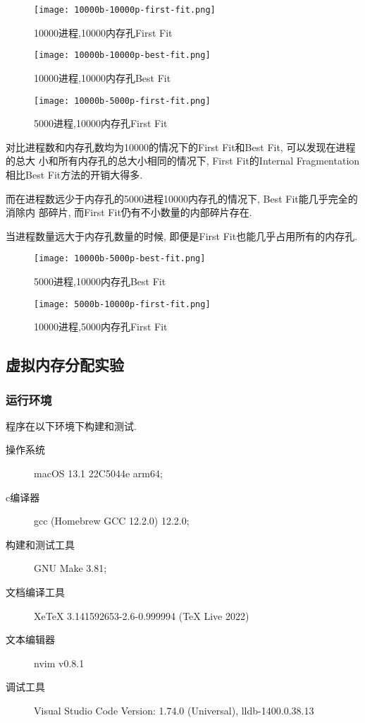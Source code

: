 \begin{figure}[ht!]
    \centering
    \texttt{[image: 10000b-10000p-first-fit.png]}
    \caption{10000进程,10000内存孔First Fit}
    \label{fig:10000p10000b-first}
\end{figure}

\begin{figure}[ht!]
    \centering
    \texttt{[image: 10000b-10000p-best-fit.png]}
    \caption{10000进程,10000内存孔Best Fit}
    \label{fig:10000p10000b-best}
\end{figure}

\begin{figure}[ht!]
    \centering
    \texttt{[image: 10000b-5000p-first-fit.png]}
    \caption{5000进程,10000内存孔First Fit}
    \label{fig:5000p10000b-first}
\end{figure}

对比进程数和内存孔数均为10000的情况下的First Fit和Best Fit, 可以发现在进程的总大
小和所有内存孔的总大小相同的情况下, First Fit的Internal Fragmentation相比Best
Fit方法的开销大得多.\par

而在进程数远少于内存孔的5000进程10000内存孔的情况下, Best Fit能几乎完全的消除内
部碎片, 而First Fit仍有不小数量的内部碎片存在.\par

当进程数量远大于内存孔数量的时候, 即便是First Fit也能几乎占用所有的内存孔.

\begin{figure}[ht!]
    \centering
    \texttt{[image: 10000b-5000p-best-fit.png]}
    \caption{5000进程,10000内存孔Best Fit}
    \label{fig:5000p10000b-best}
\end{figure}

\begin{figure}[ht!]
    \centering
    \texttt{[image: 5000b-10000p-first-fit.png]}
    \caption{10000进程,5000内存孔First Fit}
    \label{fig:10000p5000b-first}
\end{figure}

\subsection{虚拟内存分配实验}
\subsubsection{运行环境}
程序在以下环境下构建和测试.
\begin{description}
    \item[操作系统] macOS 13.1 22C5044e arm64;
    \item[c编译器] gcc (Homebrew GCC 12.2.0) 12.2.0;
    \item[构建和测试工具] GNU Make 3.81;
    \item[文档编译工具] XeTeX 3.141592653-2.6-0.999994 (TeX Live 2022)
    \item[文本编辑器] nvim v0.8.1
    \item[调试工具] Visual Studio Code Version: 1.74.0 (Universal),
        lldb-1400.0.38.13
\end{description}

